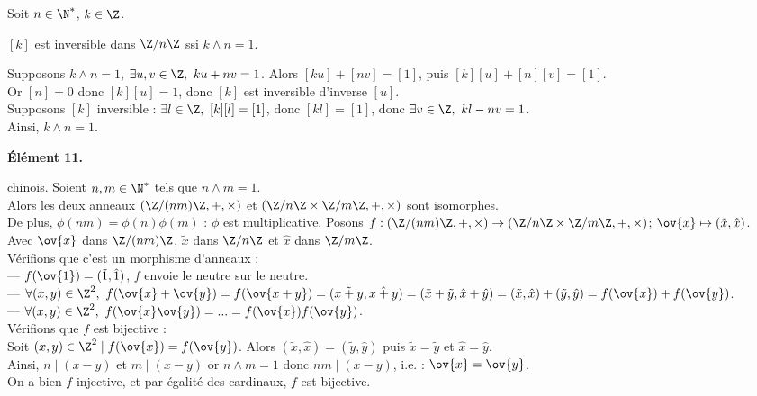 \documentclass[11pt]{article}
\begin{document}
\begin{thm}{ }{}
    Soit $n\in\N^*$, $k\in\Z$.
    \begin{center}
        $[k]$ est inversible dans $\Z/n\Z$ ssi $k\land n = 1$.
    \end{center}
    \tcblower
    \boxed{$\Leftarrow$} Supposons $k\land n = 1$, $\exists u,v \in \Z, ~ ku+nv=1$. Alors $[ku]+[nv]=[1]$, puis $[k][u]+[n][v]=[1]$.\\
    Or $[n]=0$ donc $[k][u]=1$, donc $[k]$ est inversible d'inverse $[u]$.\\
    \boxed{$\Rightarrow$} Supposons $[k]$ inversible : $\exists l \in \Z, ~ [k][l]=[1]$, donc $[kl]=[1]$, donc $\exists v \in \Z, ~ kl-nv=1$.\\
    Ainsi, $k\land n = 1$.
\end{thm}

\pagebreak

\begin{center}
    \bf{Élément 11.}
\end{center}

\begin{thm}{chinois.  }{}
    Soient $n,m\in\N^*$ tels que $n\land m=1$.\\
    Alors les deux anneaux $(\Z/(nm)\Z,+,\times)$ et $(\Z/n\Z\times\Z/m\Z,+,\times)$ sont isomorphes.\\
    De plus, $\phi(nm)=\phi(n)\phi(m)$ : $\phi$ est multiplicative.
    \tcblower
    Posons $f:(\Z/(nm)\Z,+,\times)\to(\Z/n\Z\times\Z/m\Z,+,\times)$; $\ov{x}\mapsto(\tilde{x},\hat{x})$.\\
    Avec $\ov{x}$ dans $\Z/(nm)\Z$, $\tilde{x}$ dans $\Z/n\Z$ et $\hat{x}$ dans $\Z/m\Z$.\\
    Vérifions que c'est un morphisme d'anneaux :\\
    --- $f(\ov{1})=(\tilde{1},\hat{1})$, $f$ envoie le neutre sur le neutre.\\
    --- $\forall (x,y) \in \Z^2, ~ f(\ov{x}+\ov{y})=f(\ov{x+y})=(\tilde{x+y},\hat{x+y})=(\tilde{x}+\tilde{y},\hat{x}+\hat{y})=(\tilde{x},\hat{x})+(\tilde{y},\hat{y})=f(\ov{x})+f(\ov{y})$.\\
    --- $\forall (x,y) \in \Z^2, ~ f(\ov{x}\ov{y})=...=f(\ov{x})f(\ov{y})$.\\
    Vérifions que $f$ est bijective :\\
    Soit $(x,y)\in\Z^2 \mid f(\ov{x})=f(\ov{y})$. Alors $(\tilde{x},\hat{x})=(\tilde{y},\hat{y})$ puis $\tilde{x}=\tilde{y}$ et $\hat{x}=\hat{y}$.\\
    Ainsi, $n \mid (x-y)$ et $m \mid (x-y)$ or $n\land m = 1$ donc $nm \mid (x-y)$, i.e. : $\ov{x}=\ov{y}$.\\
    On a bien $f$ injective, et par égalité des cardinaux, $f$ est bijective.
\end{thm}
\end{document}
